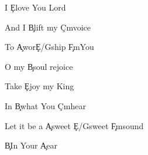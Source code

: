 \documentclass[9pt]{extarticle}
\begin{document}
\bsong

\bv
I \c{E}love You Lord

And I \c{B}lift my \c{C\s m}voice

To \c{A}wor\c{E/G\s }ship \c{F\s m}You

O my \c{B}soul rejoice



Take \c{E}joy my King

In \c{B}what You \c{C\s m}hear

Let it be a \c{A}sweet \c{E/G\s }sweet \c{F\s m}sound

\c{B}In Your \c{A}ear
\ev

\esong
\end{document}
